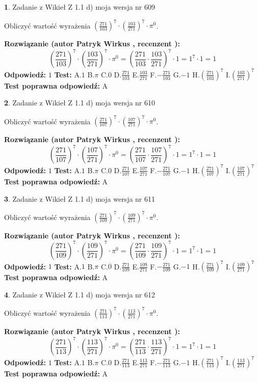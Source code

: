 \documentclass[12pt, a4paper]{article}
\theoremstyle{definition} %
\newtheorem{zad}{}
\newcommand{\zadStart}[1]{\begin{zad}#1\newline}
\newcommand{\zadStop}{\end{zad}}
\newcommand{\rozwStart}[2]{\noindent \textbf{Rozwiązanie (autor #1 , recenzent #2): }\newline}
\newcommand{\rozwStop}{\newline}
\newcommand{\odpStart}{\noindent \textbf{Odpowiedź:}\newline}
\newcommand{\odpStop}{\newline}
\newcommand{\testStart}{\noindent \textbf{Test:}\newline}
\newcommand{\testStop}{\newline}
\newcommand{\kluczStart}{\noindent \textbf{Test poprawna odpowiedź:}\newline}
\newcommand{\kluczStop}{\newline}
\begin{document}
\zadStart{Zadanie z Wikieł Z 1.1 d) moja wersja nr 609}

Obliczyć wartość wyrażenia $(\frac{271}{103})^{7} \cdot (\frac{103}{271})^{7} \cdot \pi^{0}$.
\zadStop
\rozwStart{Patryk Wirkus}{}
$$(\frac{271}{103})^{7} \cdot (\frac{103}{271})^{7} \cdot \pi^{0} = (\frac{271}{103} \cdot \frac{103}{271})^{7} \cdot 1 = 1^{7} \cdot 1 = 1$$
\rozwStop
\odpStart
$1$
\odpStop
\testStart
A.$1$ B.$\pi$ C.$0$ D.$\frac{271}{103}$ E.$\frac{103}{271}$
F.$-\frac{271}{103}$ G.$-1$
H.$(\frac{271}{103})^{7}$
I.$(\frac{103}{271})^{7}$
\testStop
\kluczStart
A
\kluczStop



\zadStart{Zadanie z Wikieł Z 1.1 d) moja wersja nr 610}

Obliczyć wartość wyrażenia $(\frac{271}{107})^{7} \cdot (\frac{107}{271})^{7} \cdot \pi^{0}$.
\zadStop
\rozwStart{Patryk Wirkus}{}
$$(\frac{271}{107})^{7} \cdot (\frac{107}{271})^{7} \cdot \pi^{0} = (\frac{271}{107} \cdot \frac{107}{271})^{7} \cdot 1 = 1^{7} \cdot 1 = 1$$
\rozwStop
\odpStart
$1$
\odpStop
\testStart
A.$1$ B.$\pi$ C.$0$ D.$\frac{271}{107}$ E.$\frac{107}{271}$
F.$-\frac{271}{107}$ G.$-1$
H.$(\frac{271}{107})^{7}$
I.$(\frac{107}{271})^{7}$
\testStop
\kluczStart
A
\kluczStop



\zadStart{Zadanie z Wikieł Z 1.1 d) moja wersja nr 611}

Obliczyć wartość wyrażenia $(\frac{271}{109})^{7} \cdot (\frac{109}{271})^{7} \cdot \pi^{0}$.
\zadStop
\rozwStart{Patryk Wirkus}{}
$$(\frac{271}{109})^{7} \cdot (\frac{109}{271})^{7} \cdot \pi^{0} = (\frac{271}{109} \cdot \frac{109}{271})^{7} \cdot 1 = 1^{7} \cdot 1 = 1$$
\rozwStop
\odpStart
$1$
\odpStop
\testStart
A.$1$ B.$\pi$ C.$0$ D.$\frac{271}{109}$ E.$\frac{109}{271}$
F.$-\frac{271}{109}$ G.$-1$
H.$(\frac{271}{109})^{7}$
I.$(\frac{109}{271})^{7}$
\testStop
\kluczStart
A
\kluczStop



\zadStart{Zadanie z Wikieł Z 1.1 d) moja wersja nr 612}

Obliczyć wartość wyrażenia $(\frac{271}{113})^{7} \cdot (\frac{113}{271})^{7} \cdot \pi^{0}$.
\zadStop
\rozwStart{Patryk Wirkus}{}
$$(\frac{271}{113})^{7} \cdot (\frac{113}{271})^{7} \cdot \pi^{0} = (\frac{271}{113} \cdot \frac{113}{271})^{7} \cdot 1 = 1^{7} \cdot 1 = 1$$
\rozwStop
\odpStart
$1$
\odpStop
\testStart
A.$1$ B.$\pi$ C.$0$ D.$\frac{271}{113}$ E.$\frac{113}{271}$
F.$-\frac{271}{113}$ G.$-1$
H.$(\frac{271}{113})^{7}$
I.$(\frac{113}{271})^{7}$
\testStop
\kluczStart
A
\kluczStop
\end{document}
